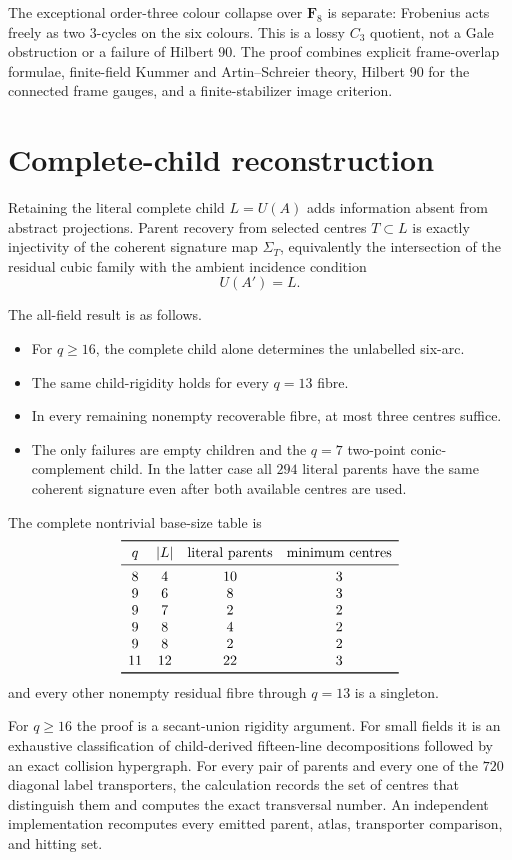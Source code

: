 \documentclass[11pt]{article}
\newcommand{\F}{\mathbf F}
\begin{document}
The exceptional order-three colour collapse over $\F_8$ is separate:
Frobenius acts freely as two $3$-cycles on the six colours.  This is a
lossy $C_3$ quotient, not a Gale obstruction or a failure of Hilbert 90.
The proof combines explicit frame-overlap formulae, finite-field Kummer
and Artin--Schreier theory, Hilbert 90 for the connected frame gauges, and
a finite-stabilizer image criterion.

\section{Complete-child reconstruction}

Retaining the literal complete child $L=U(A)$ adds information absent from
abstract projections.  Parent recovery from selected centres $T\subset L$
is exactly injectivity of the coherent signature map $\Sigma_T$,
equivalently the intersection of the residual cubic family with the
ambient incidence condition
\[
 U(A')=L.
\]

The all-field result is as follows.
\begin{itemize}
\item For $q\geq16$, the complete child alone determines the unlabelled
six-arc.
\item The same child-rigidity holds for every $q=13$ fibre.
\item In every remaining nonempty recoverable fibre, at most three centres
suffice.
\item The only failures are empty children and the $q=7$ two-point
conic-complement child.  In the latter case all $294$ literal parents have
the same coherent signature even after both available centres are used.
\end{itemize}

The complete nontrivial base-size table is
\[
\begin{array}{c@{\quad}c@{\quad}c@{\quad}c}
\toprule
q&|L|&\text{literal parents}&\text{minimum centres}\\
\midrule
8&4&10&3\\
9&6&8&3\\
9&7&2&2\\
9&8&4&2\\
9&8&2&2\\
11&12&22&3\\
\bottomrule
\end{array}
\]
and every other nonempty residual fibre through $q=13$ is a singleton.

For $q\geq16$ the proof is a secant-union rigidity argument.  For small
fields it is an exhaustive classification of child-derived fifteen-line
decompositions followed by an exact collision hypergraph.  For every pair
of parents and every one of the $720$ diagonal label transporters, the
calculation records the set of centres that distinguish them and computes
the exact transversal number.  An independent implementation recomputes
every emitted parent, atlas, transporter comparison, and hitting set.
\end{document}
